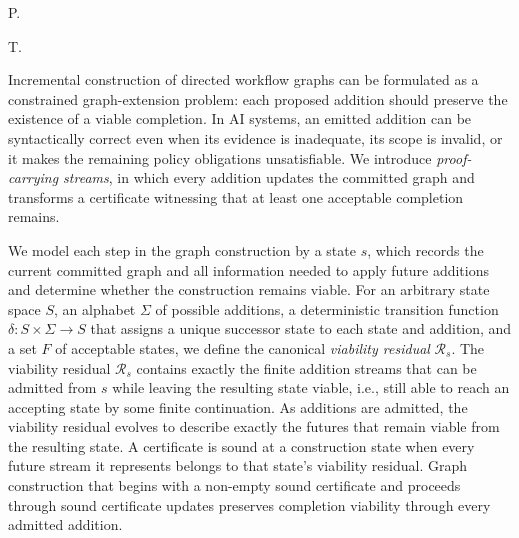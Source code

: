 \documentclass[a4paper,11pt,twoside,russian,english]{article}
\newcommand{\Residual}{\mathcal R}
\begin{document}
\author{Kingston}{P.} %
\author{Fagnoni}{T.} %




\CMAImaketitle

Incremental construction of directed workflow graphs can be formulated as a constrained graph-extension problem: each proposed addition should preserve the existence of a viable completion. In AI systems, an emitted addition can be syntactically correct even when its evidence is inadequate, its scope is invalid, or it makes the remaining policy obligations unsatisfiable. We introduce \emph{proof-carrying streams}, in which every addition updates the committed graph and transforms a certificate witnessing that at least one acceptable completion remains.

We model each step in the graph construction by a state $s$, which records the current committed graph and all information needed to apply future additions and determine whether the construction remains viable. For an arbitrary state space $S$, an alphabet $\Sigma$ of possible additions, a deterministic transition function $\delta : S \times \Sigma \to S$ that assigns a unique successor state to each state and addition, and a set $F$ of acceptable states, we define the canonical \emph{viability residual} $\Residual_s$. The viability residual $\Residual_s$ contains exactly the finite addition streams that can be admitted from $s$ while leaving the resulting state viable, i.e., still able to reach an accepting state by some finite continuation. As additions are admitted, the viability residual evolves to describe exactly the futures that remain viable from the resulting state. A certificate is sound at a construction state when every future stream it represents belongs to that state's viability residual. Graph construction that begins with a non-empty sound certificate and proceeds through sound certificate updates preserves completion viability through every admitted addition.
\end{document}
